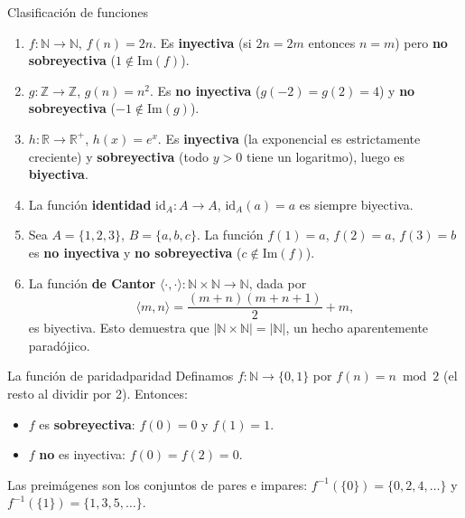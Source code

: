 \begin{ejemplo}{Clasificación de funciones}{}
\begin{enumerate}[leftmargin=2em, label=(\alph*)]
  \item $f: \mathbb{N} \to \mathbb{N}$, $f(n) = 2n$. Es \textbf{inyectiva} (si $2n = 2m$ entonces $n = m$) pero \textbf{no sobreyectiva} ($1 \notin \mathrm{Im}(f)$).

  \item $g: \mathbb{Z} \to \mathbb{Z}$, $g(n) = n^2$. Es \textbf{no inyectiva} ($g(-2) = g(2) = 4$) y \textbf{no sobreyectiva} ($-1 \notin \mathrm{Im}(g)$).

  \item $h: \mathbb{R} \to \mathbb{R}^+$, $h(x) = e^x$. Es \textbf{inyectiva} (la exponencial es estrictamente creciente) y \textbf{sobreyectiva} (todo $y > 0$ tiene un logaritmo), luego es \textbf{biyectiva}.

  \item La función \textbf{identidad} $\mathrm{id}_A: A \to A$, $\mathrm{id}_A(a) = a$ es siempre biyectiva.

  \item Sea $A = \{1, 2, 3\}$, $B = \{a, b, c\}$. La función $f(1) = a$, $f(2) = a$, $f(3) = b$ es \textbf{no inyectiva} y \textbf{no sobreyectiva} ($c \notin \mathrm{Im}(f)$).

  \item La función \textbf{de Cantor} $\langle \cdot, \cdot \rangle: \mathbb{N} \times \mathbb{N} \to \mathbb{N}$, dada por
  \[
    \langle m, n \rangle = \frac{(m+n)(m+n+1)}{2} + m,
  \]
  es biyectiva. Esto demuestra que $|\mathbb{N} \times \mathbb{N}| = |\mathbb{N}|$, un hecho aparentemente paradójico.
\end{enumerate}
\end{ejemplo}

\begin{ejemplo}{La función de paridad}{paridad}
Definamos $f: \mathbb{N} \to \{0,1\}$ por $f(n) = n \bmod 2$ (el resto al dividir por 2). Entonces:
\begin{itemize}[leftmargin=2em]
  \item $f$ es \textbf{sobreyectiva}: $f(0) = 0$ y $f(1) = 1$.
  \item $f$ \textbf{no} es inyectiva: $f(0) = f(2) = 0$.
\end{itemize}
Las preimágenes son los conjuntos de pares e impares: $f^{-1}(\{0\}) = \{0, 2, 4, \ldots\}$ y $f^{-1}(\{1\}) = \{1, 3, 5, \ldots\}$.
\end{ejemplo}

